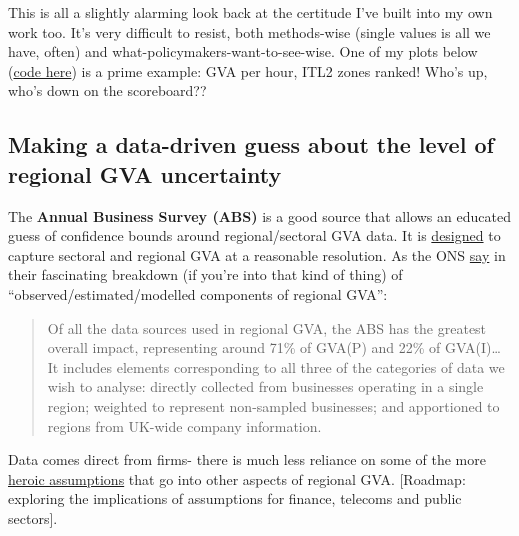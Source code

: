\documentclass[
  letterpaper,
  DIV=11,
  numbers=noendperiod]{scrartcl}
\begin{document}
This is all a slightly alarming look back at the certitude I've built
into my own work too. It's very difficult to resist, both methods-wise
(single values is all we have, often) and
what-policymakers-want-to-see-wise. One of my plots below
(\href{https://danolner.github.io/RegionalEconomicTools/gdp_gaps.html}{code
here}) is a prime example: GVA per hour, ITL2 zones ranked! Who's up,
who's down on the scoreboard??

\subsection{Making a data-driven guess about the level of regional GVA
uncertainty}\label{making-a-data-driven-guess-about-the-level-of-regional-gva-uncertainty}

The \textbf{Annual Business Survey (ABS)} is a good source that allows
an educated guess of confidence bounds around regional/sectoral GVA
data. It is
\href{https://www.ons.gov.uk/businessindustryandtrade/business/businessservices/methodologies/annualbusinesssurveyqmi}{designed}
to capture sectoral and regional GVA at a reasonable resolution. As the
ONS
\href{https://www.ons.gov.uk/economy/grossvalueaddedgva/articles/analysisoftheextentofmodellingandestimationinregionalgrossvalueadded/2018-03-28\#principal-data-sources-used-in-regional-gross-value-added}{say}
in their fascinating breakdown (if you're into that kind of thing) of
``observed/estimated/modelled components of regional GVA'':

\begin{quote}
Of all the data sources used in regional GVA, the ABS has the greatest
overall impact, representing around 71\% of GVA(P) and 22\% of
GVA(I)\ldots{} It includes elements corresponding to all three of the
categories of data we wish to analyse: directly collected from
businesses operating in a single region; weighted to represent
non-sampled businesses; and apportioned to regions from UK-wide company
information.
\end{quote}

Data comes direct from firms- there is much less reliance on some of the
more
\href{https://exobrain.coveredinbees.org/attachments/heroic-assumptions/}{heroic
assumptions} that go into other aspects of regional GVA. {[}Roadmap:
exploring the implications of assumptions for finance, telecoms and
public sectors{]}.
\end{document}
